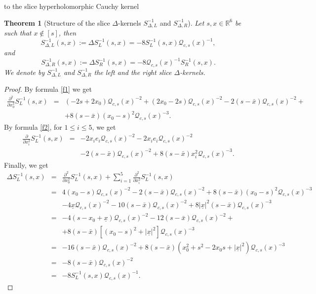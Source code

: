 \documentclass[reqno,11pt]{amsart}
\numberwithin{equation}{section}
\newtheorem{theorem}{Theorem}[section]
\theoremstyle{definition}
\begin{document}
to the slice hyperholomorphic Cauchy kernel
\begin{theorem}[Structure of the slice $ \Delta$-kernels $S^{-1}_{\Delta,L}$ and $S^{-1}_{\Delta,R}$]
	\label{app2}
	Let $s,x \in \mathbb{R}^6$ be such that $x \notin [s]$, then
	\begin{equation}
		\label{third}
		S^{-1}_{\Delta ,L}(s,x):=\Delta S^{-1}_L(s,x)=-8S^{-1}_L(s,x) \mathcal{Q}_{c,s}(x)^{-1},
	\end{equation}
	and
	\begin{equation}
		\label{fourth}
		S^{-1}_{\Delta ,R}(s,x):=\Delta S^{-1}_R(s,x)=-8 \mathcal{Q}_{c,s}(x)^{-1}S^{-1}_R(s,x) .
	\end{equation}
	We denote by $S^{-1}_{\Delta,L}$ and $S^{-1}_{\Delta,R}$ the left and the right slice $ \Delta$-kernels.
\end{theorem}
\begin{proof}
	By formula \eqref{f1} we get
	\begin{eqnarray*}
		\frac{\partial^2}{\partial x_0^2} S^{-1}_L(s,x)&=& (-2s+2x_0) \mathcal{Q}_{c,s}(x)^{-2}+(2x_0-2s) \mathcal{Q}_{c,s}(x)^{-2}-2(s-\bar{x}) \mathcal{Q}_{c,s}(x)^{-2}+\\
		&& +8 (s- \bar{x})(x_0-s)^2 \mathcal{Q}_{c,s}(x)^{-3}.
	\end{eqnarray*}
	By formula \eqref{f2}, for $1 \leq i \leq 5$, we get
	\begin{eqnarray*}
		\frac{\partial}{\partial x_i^2} S^{-1}_L(s,x)&=& -2x_i e_i \mathcal{Q}_{c,s}(x)^{-2}-2 x_i e_i \mathcal{Q}_{c,s}(x)^{-2}\\
		&& -2(s- \bar{x}) \mathcal{Q}_{c,s}(x)^{-2}+8 (s- \bar{x}) x_i^2 \mathcal{Q}_{c,s}(x)^{-3}.
	\end{eqnarray*}
	Finally, we get
	\begin{eqnarray*}
		\Delta S^{-1}_L(s,x)&=& \frac{\partial^2}{\partial x_0^2}S^{-1}_L(s,x)+ \sum_{i=1}^5 \frac{\partial^2}{\partial x_i^2}S^{-1}_L(s,x)\\
		&=& 4(x_0-s) \mathcal{Q}_{c,s}(x)^{-2}-2(s- \bar{x}) \mathcal{Q}_{c,s}(x)^{-2}+8(s- \bar{x}) (x_0-s)^2 \mathcal{Q}_{c,s}(x)^{-3}\\
		&& -4 \underline{x} \mathcal{Q}_{c,s}(x)^{-2}-10 (s- \bar{x}) \mathcal{Q}_{c,s}(x)^{-2}+8 | \underline{x}|^2 (s- \bar{x}) \mathcal{Q}_{c,s}(x)^{-3}\\
		&=& -4(s-x_0+ \underline{x}) \mathcal{Q}_{c,s}(x)^{-2}-12(s- \bar{x}) \mathcal{Q}_{c,s}(x)^{-2}+\\
		&& + 8(s- \bar{x}) [(x_0-s)^2+| \underline{x}|^2] \mathcal{Q}_{c,s}(x)^{-3}\\
		&=& -16(s- \bar{x}) \mathcal{Q}_{c,s}(x)^{-2}+8(s- \bar{x})(x_0^2+s^2-2x_0s+| \underline{x}|^2) \mathcal{Q}_{c,s}(x)^{-3}\\
		&=& -8(s- \bar{x}) \mathcal{Q}_{c,s}(x)^{-2}\\
		&=& -8 S_{L}^{-1}(s,x) \mathcal{Q}_{c,s}(x)^{-1}.
	\end{eqnarray*}
\end{proof}
\end{document}
